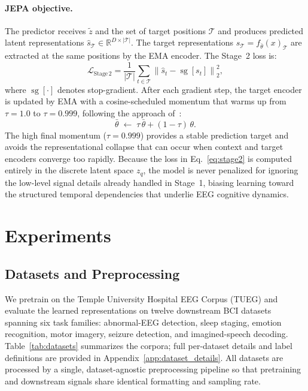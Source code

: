 \documentclass{article}
\begin{document}
\paragraph{JEPA objective.}
The predictor receives $\tilde{z}$ and the set of target positions $\mathcal{T}$ and produces predicted latent representations $\hat{s}_{\mathcal{T}} \in \mathbb{R}^{D \times |\mathcal{T}|}$.
The target representations $s_{\mathcal{T}} = f_{\bar{\theta}}(x)_{\mathcal{T}}$ are extracted at the same positions by the EMA encoder.
The Stage~2 loss is:
\begin{equation}
  \mathcal{L}_{\mathrm{Stage\,2}} = \frac{1}{|\mathcal{T}|}\sum_{t \in \mathcal{T}} \left\|\hat{s}_t - \operatorname{sg}[s_t]\right\|_2^2,
  \label{eq:stage2}
\end{equation}
where $\operatorname{sg}[\cdot]$ denotes stop-gradient.
After each gradient step, the target encoder is updated by EMA with a cosine-scheduled momentum that warms up from $\tau = 1.0$ to $\tau = 0.999$, following the approach of~\citet{assran2023selfsupervisedlearningimagesjointembedding}:
\begin{equation}
  \bar{\theta} \;\leftarrow\; \tau\,\bar{\theta} + (1-\tau)\,\theta.
\end{equation}
The high final momentum ($\tau = 0.999$) provides a stable prediction target and avoids the representational collapse that can occur when context and target encoders converge too rapidly.
Because the loss in Eq.~\eqref{eq:stage2} is computed entirely in the discrete latent space $z_q$, the model is never penalized for ignoring the low-level signal details already handled in Stage~1, biasing learning toward the structured temporal dependencies that underlie EEG cognitive dynamics.


\section{Experiments}

\subsection{Datasets and Preprocessing}
\label{subsec:datasets}

We pretrain on the Temple University Hospital EEG Corpus (TUEG) and evaluate the learned representations on twelve downstream BCI datasets spanning six task families: abnormal-EEG detection, sleep staging, emotion recognition, motor imagery, seizure detection, and imagined-speech decoding.
Table~\ref{tab:datasets} summarizes the corpora; full per-dataset details and label definitions are provided in Appendix~\ref{app:dataset_details}.
All datasets are processed by a single, dataset-agnostic preprocessing pipeline so that pretraining and downstream signals share identical formatting and sampling rate.
\end{document}

